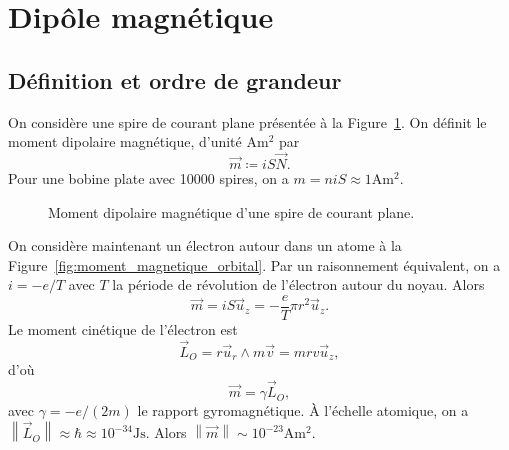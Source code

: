 \section{Dipôle magnétique}
\subsection{Définition et ordre de grandeur}

On considère une spire de courant plane présentée à la Figure~\ref{fig:moment_dipolaire_magnetique_spire_plane}. On définit le moment dipolaire magnétique, d'unité $\si{\ampere\metre\squared}$ par
\begin{equation*}
    \boxed{
        \vec{m}\coloneqq iS\vec{N}.
    }
\end{equation*}
Pour une bobine plate avec 10000 spires, on a $m=niS\approx1\si{\ampere\metre\squared}$.

\begin{figure}
    \centering
    \caption{Moment dipolaire magnétique d'une spire de courant plane.}
    \label{fig:moment_dipolaire_magnetique_spire_plane}
\end{figure}

On considère maintenant un électron autour dans un atome à la Figure~\ref{fig:moment_magnetique_orbital}. Par un raisonnement équivalent, on a $i=-e/T$ avec $T$ la période de révolution de l'électron autour du noyau. Alors 
\begin{equation*}
    \vec{m}=iS\vec{u}_z=-\frac{e}{T}\pi r^{2}\vec{u}_z.
\end{equation*}
Le moment cinétique de l'électron est 
\begin{equation*}
    \vec{L}_O=r\vec{u}_r\wedge m\vec{v}=mrv\vec{u}_z,
\end{equation*}
d'où
\begin{equation*}
    \boxed{
        \vec{m}=\gamma\vec{L}_O,
    }
\end{equation*}
avec $\gamma=-e/(2m)$ le rapport gyromagnétique. À l'échelle atomique, on a $\left\lVert\vec{L}_O\right\rVert\approx\hbar\approx10^{-34}\si{\joule\second}$. Alors $\left\lVert\vec{m}\right\rVert\sim10^{-23}\si{\ampere\metre\squared}$.

